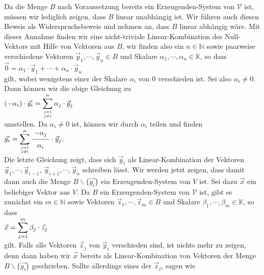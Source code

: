 \proof
Da die Menge $B$ nach Voraussetzung bereits ein Erzeugenden-System von $\mathcal{V}$ ist, m\"{u}ssen wir
lediglich zeigen, dass $B$ linear unabh\"{a}ngig ist.  Wir f\"{u}hren auch diesen Beweis als
Widerspruchsbeweis und nehmen an, dass $B$ linear abh\"{a}ngig w\"{a}re.  Mit dieser Annahme finden wir eine
nicht-triviale Linear-Kombination des Null-Vektors mit Hilfe von Vektoren aus $B$, wir finden also
ein $n \in \mathbb{N}$ sowie paarweise verschiedene Vektoren $\vec{y}_1, \cdots, \vec{y}_n \in B$ und Skalare
$\alpha_1, \cdots, \alpha_n \in \mathbb{K}$, so dass
\\[0.2cm]
\hspace*{1.3cm}
$\vec{0} =  \alpha_1 \cdot \vec{y}_1 + \cdots + \alpha_n \cdot \vec{y}_n$
\\[0.2cm]
gilt, wobei wenigstens einer der Skalare $\alpha_i$ von $0$ verschieden ist.  Sei also $\alpha_i \not= 0$. 
Dann k\"{o}nnen wir die obige Gleichung zu 
\\[0.2cm]
\hspace*{1.3cm}
$\displaystyle(-\alpha_i) \cdot \vec{y_i} = \sum\limits_{j=1 \atop j\not=i}^n \alpha_j \cdot \vec{y}_j$
\\[0.2cm]
umstellen.  Da $\alpha_i \not= 0$ ist, k\"{o}nnen wir durch $\alpha_i$ teilen und finden
\\[0.2cm]
\hspace*{1.3cm}
$\ds \vec{y_i} = \sum\limits_{j=1 \atop j\not=i}^n \bruch{-\alpha_j}{\alpha_i} \cdot \vec{y}_j$.
\\[0.2cm]
Die letzte Gleichung zeigt, dass sich $\vec{y}_i$ als Linear-Kombination der Vektoren
$\vec{y}_1, \cdots, \vec{y}_{i-1}$,  $\vec{y}_{i+1}, \cdots, \vec{y}_n$ schreiben l\"{a}sst.  Wir werden jetzt zeigen, dass damit dann auch die Menge
$B \backslash \{ \vec{y_i} \}$ ein Erzeugenden-System von $V$ ist.  Sei dazu $\vec{x}$ ein
beliebiger Vektor aus $V$.  Da $B$ ein Erzeugenden-System von $\mathcal{V}$ ist, gibt es zun\"{a}chst 
ein $m \in\mathbb{N}$ sowie Vektoren $\vec{z}_1, \cdots, \vec{z}_m \in B$ und Skalare $\beta_1, \cdots,
\beta_m \in \mathbb{K}$, so dass
\\[0.2cm]
\hspace*{1.3cm}
$\displaystyle \vec{x} = \sum\limits_{j=1}^m \beta_j \cdot \vec{z}_j$
\\[0.2cm]
gilt.   Falls alle Vektoren $\vec{z}_j$ von $\vec{y}_i$ verschieden sind,  ist nichts mehr zu
zeigen, denn dann haben wir $\vec{x}$ bereits als Linear-Kombination von Vektoren der Menge $B \backslash \{\vec{y_i}\}$ 
geschrieben.  Sollte allerdings eines der $\vec{z}_j$, sagen wie
